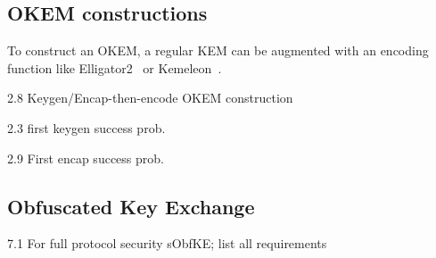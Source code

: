 
\subsection{OKEM constructions}

To construct an OKEM, a regular KEM can be augmented with an encoding function like \textsf{Elligator2}~\cite{CCS:BHKL13} or \textsf{Kemeleon}~\cite[Sec. 2.4]{CCS:GunSteVei24}.

\begin{definition}\label{def:keygen-encap-then-encode}
    2.8 Keygen/Encap-then-encode OKEM construction
\end{definition}

\begin{definition}\label{def:first-keygen-success}
    2.3 first keygen success prob.
\end{definition}

\begin{definition}\label{def:first-encap-success}
    2.9 First encap success prob.
\end{definition}

\subsection{Obfuscated Key Exchange}

\begin{theorem}\label{thm:s-obfuscated-keyex-security}
    7.1 For full protocol security sObfKE; list all requirements
\end{theorem}